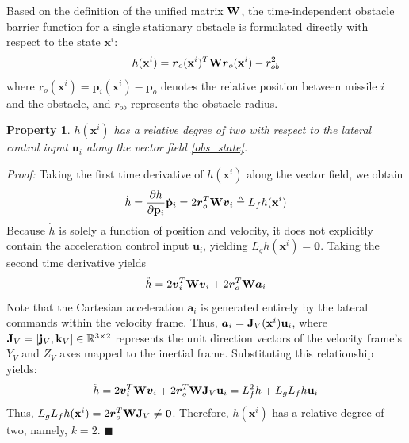 \documentclass[lettersize,journal]{IEEEtran}
\newtheorem{property}{Property}
\begin{document}
Based on the definition of the unified matrix ${\bf{W}}$, the time-independent obstacle barrier function for a single stationary obstacle is formulated directly with respect to the state $\mathbf{x}^i$:
\begin{equation}
	h(\mathbf{x}^i) = {\boldsymbol{r}}_o(\mathbf{x}^i)^T{\bf{W}}{{\boldsymbol{r}}_o(\mathbf{x}^i)} - r_{ob}^2
\end{equation}
where ${{\boldsymbol{r}}_o(\mathbf{x}^i)} = {{\boldsymbol{p}}_i(\mathbf{x}^i)} - {{\boldsymbol{p}}_o}$ denotes the relative position between missile $i$ and the obstacle, and $r_{ob}$ represents the obstacle radius.

\begin{property}
	$h(\mathbf{x}^i)$ has a relative degree of two with respect to the lateral control input $\mathbf{u}_i$ along the vector field \eqref{obs_state}.
\end{property}

\textit{Proof:}
Taking the first time derivative of $h(\mathbf{x}^i)$ along the vector field, we obtain
\begin{equation}
	\dot h = \frac{\partial h}{\partial \mathbf{p}_i} \dot{\mathbf{p}}_i = 2{\boldsymbol{r}}_o^T{\bf{W}}{{\boldsymbol{v}}_i} \triangleq {L_f}h(\mathbf{x}^i)
\end{equation}
Because $\dot{h}$ is solely a function of position and velocity, it does not explicitly contain the acceleration control input $\mathbf{u}_i$, yielding $L_g h(\mathbf{x}^i) = \mathbf{0}$. Taking the second time derivative yields
\begin{equation}
	\ddot h = 2{\boldsymbol{v}}_i^T{\bf{W}}{{\boldsymbol{v}}_i} + 2{\boldsymbol{r}}_o^T{\bf{W}}{{\boldsymbol{a}}_i}
\end{equation}
Note that the Cartesian acceleration ${\boldsymbol{a}}_i$ is generated entirely by the lateral commands within the velocity frame. Thus, ${\boldsymbol{a}}_i = {\bf{J}}_V(\mathbf{x}^i) \mathbf{u}_i$, where ${\bf{J}}_V = [\mathbf{j}_V, \mathbf{k}_V] \in \mathbb{R}^{3 \times 2}$ represents the unit direction vectors of the velocity frame's $Y_V$ and $Z_V$ axes mapped to the inertial frame. Substituting this relationship yields:
\begin{equation}
	\ddot h = 2{\boldsymbol{v}}_i^T{\bf{W}}{{\boldsymbol{v}}_i} + 2{\boldsymbol{r}}_o^T{\bf{W}}{\bf{J}}_V \mathbf{u}_i = L_f^2h + {L_g}{L_f}h \mathbf{u}_i
\end{equation}
Thus, $L_g L_f h(\mathbf{x}^i) = 2{\boldsymbol{r}}_o^T{\bf{W}}{\bf{J}}_V \neq \mathbf{0}$. Therefore, $h(\mathbf{x}^i)$ has a relative degree of two, namely, $k=2$. \hfill $\blacksquare$
\end{document}
